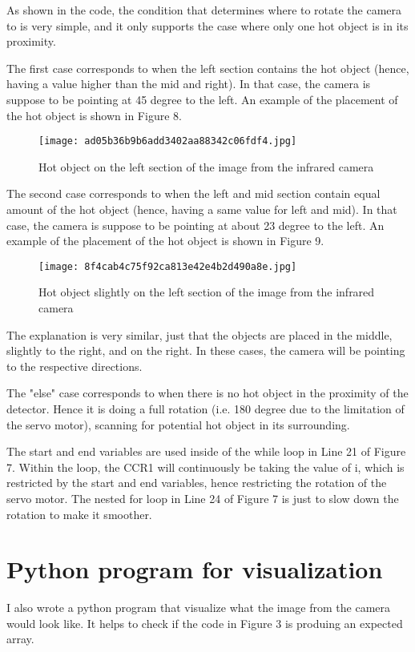 \documentclass[12pt]{article}
\begin{document}
As shown in the code, the condition that determines where to rotate the camera to is very simple, and it only supports the case where only one hot object is in its proximity.
\pagebreak

The first case corresponds to when the left section contains the hot object (hence, having a value higher than the mid and right). In that case, the camera is suppose to be pointing at 45 degree to the left. An example of the placement of the hot object is shown in Figure 8.

\begin{figure}[h]
\texttt{[image: ad05b36b9b6add3402aa88342c06fdf4.jpg]}
\centering
\caption{Hot object on the left section of the image from the infrared camera}
\end{figure}

\pagebreak

The second case corresponds to when the left  and mid section contain equal amount of the hot object (hence, having a same value for left and mid). In that case, the camera is suppose to be pointing at about 23 degree to the left. An example of the placement of the hot object is shown in Figure 9. 

\begin{figure}[h]
\texttt{[image: 8f4cab4c75f92ca813e42e4b2d490a8e.jpg]}
\centering
\caption{Hot object slightly on the left section of the image from the infrared camera}
\end{figure}
\pagebreak

The explanation is very similar, just that the objects are placed in the middle, slightly to the right, and on the right. In these cases, the camera will be pointing to the respective directions.

The "else" case corresponds to when there is no hot object in the proximity of the detector. Hence it is doing a full rotation (i.e. 180 degree due to the limitation of the servo motor), scanning for potential hot object in its surrounding.

The start and end variables are used inside of the while loop in Line 21 of Figure 7. Within the loop, the CCR1 will continuously be taking the value of i, which is restricted by the start and end variables, hence restricting the rotation of the servo motor. The nested for loop in Line 24 of Figure 7 is just to slow down the rotation to make it smoother.
\pagebreak

\section {Python program for visualization}
I also wrote a python program that visualize what the image from the camera would look like. It helps to check if the code in Figure 3 is produing an expected array.
\end{document}
